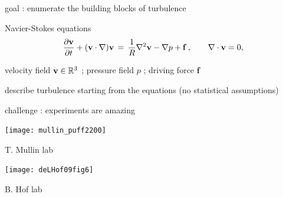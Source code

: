 \begin{frame}{goal : enumerate the building blocks of turbulence}
\begin{block}{Navier-Stokes equations} %
\[
\dfrac{\partial {\bf v}}{\partial t} + ({\bf v} \cdot \nabla) {\bf v}
	\,=\,
\frac{1}{R} \nabla ^2 {\bf v}
-\nabla p
+ \mathbf{f}
    \,,\qquad
\nabla \cdot {\bf v} = 0,
\]
\end{block}

\hfill{\small
velocity field  ${\bf v} \in \mathbb{R}^3$
;
pressure field $p$
;
driving force $\mathbf{f}$
        }

\medskip

\begin{block}{describe turbulence}
starting from the equations (no statistical assumptions)
\end{block}

\bigskip

\hfill {\Large\textcolor{red}{}}

\end{frame}

\begin{frame}{challenge : experiments are amazing}
\begin{center}
\texttt{[image: mullin\_puff2200]} %
\end{center}
T. Mullin lab
\begin{center}
\bigskip
\texttt{[image: deLHof09fig6]} %
\end{center}
B. Hof lab
\end{frame}

%
%
%
%
%
%
%
%

